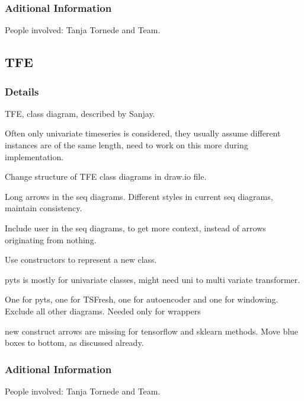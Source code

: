 \documentclass[11pt]{meetingmins} %
\begin{document}
\subsubsection{Aditional Information}
\begin{hiddensubitems}
    \item People involved: Tanja Tornede and Team.
\end{hiddensubitems}

\subsection{TFE}
\subsubsection{Details}
\begin{hiddensubitems}
    \item TFE, class diagram, described by Sanjay.
    \item Often only univariate timeseries is considered, they usually assume different instances are of the same length, need to work on this more during implementation.
    \item Change structure of TFE class diagrams in draw.io file.
    \item Long arrows in the seq diagrams. Different styles in current seq diagrams, maintain consistency.
    \item Include user in the seq diagrams, to get more context, instead of arrows originating from nothing.
    \item Use constructors to represent a new class.
    \item pyts is mostly for univariate classes, might need uni to multi variate transformer.
    \item One for pyts, one for TSFresh, one for autoencoder and one for windowing. Exclude all other diagrams. Needed only for wrappers
    \item new construct arrows are missing for tensorflow and sklearn methods. Move blue boxes to bottom, as discussed already.
\end{hiddensubitems}
\subsubsection{Aditional Information}
\begin{hiddensubitems}
    \item People involved: Tanja Tornede and Team.
\end{hiddensubitems}
\end{document}
